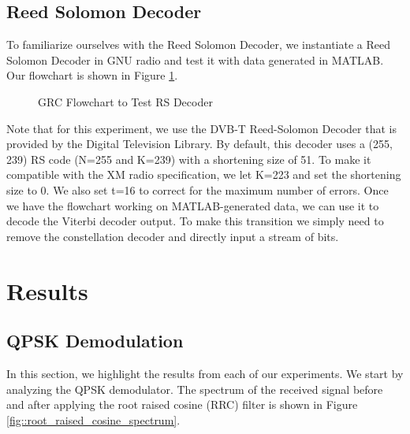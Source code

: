 \documentclass[conference,onecolumn]{IEEEtran}
\begin{document}
\subsection{Reed Solomon Decoder}

To familiarize ourselves with the Reed Solomon Decoder, we instantiate a Reed Solomon Decoder in GNU radio and test it with data generated in MATLAB. Our flowchart is shown in Figure \ref{fig::rs_test_grc}. 

\begin{figure}[H]
	\centerline{}
	\caption{GRC Flowchart to Test RS Decoder}
	\label{fig::rs_test_grc}
\end{figure}

	Note that for this experiment, we use the DVB-T Reed-Solomon Decoder that is provided by the  Digital Television Library. By default, this decoder uses a (255, 239) RS code (N=255 and K=239) with a shortening size of 51. To make it compatible with the XM radio specification, we let K=223 and set the shortening size to 0. We also set t=16 to correct for the maximum number of errors. Once we have the flowchart working on MATLAB-generated data, we can use it to decode the Viterbi decoder output. To make this transition we simply need to remove the constellation decoder and directly input a stream of bits.

\section{Results}

\subsection{QPSK Demodulation}

In this section, we highlight the results from each of our experiments. We start by analyzing the QPSK demodulator. The spectrum of the received signal before and after applying the root raised cosine (RRC) filter is shown in Figure \ref{fig::root_raised_cosine_spectrum}.
\end{document}
